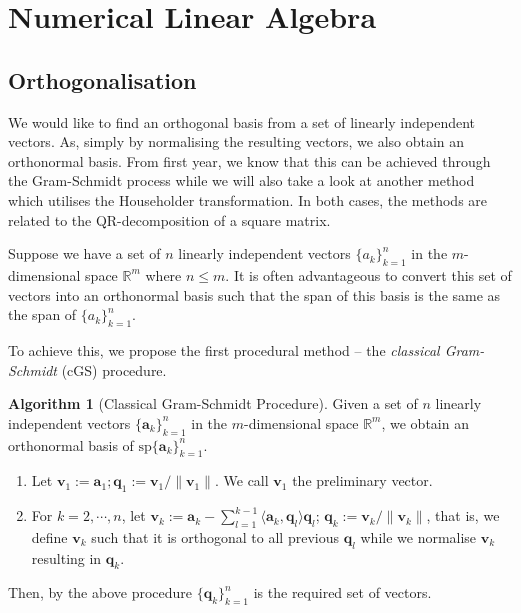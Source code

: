 \documentclass[
]{article}
\theoremstyle{definition}
\newtheorem{alg}{Algorithm}
\theoremstyle{definition}
\begin{document}
\hypertarget{numerical-linear-algebra}{%
\section{Numerical Linear Algebra}\label{numerical-linear-algebra}}

\hypertarget{orthogonalisation}{%
\subsection{Orthogonalisation}\label{orthogonalisation}}

We would like to find an orthogonal basis from a set of linearly
independent vectors. As, simply by normalising the resulting vectors, we
also obtain an orthonormal basis. From first year, we know that this can
be achieved through the Gram-Schmidt process while we will also take a
look at another method which utilises the Householder transformation. In
both cases, the methods are related to the QR-decomposition of a square
matrix.

Suppose we have a set of \(n\) linearly independent vectors
\(\{a_k\}_{k=1}^n\) in the \(m\)-dimensional space \(\mathbb{R}^m\)
where \(n \le m\). It is often advantageous to convert this set of
vectors into an orthonormal basis such that the span of this basis is
the same as the span of \(\{a_k\}_{k=1}^n\).

To achieve this, we propose the first procedural method -- the
\emph{classical Gram-Schmidt} (cGS) procedure.

\begin{alg}[Classical Gram-Schmidt Procedure]
  Given a set of \(n\) linearly independent vectors \(\{\mathbf{a}_k\}_{k=1}^n\) 
  in the \(m\)-dimensional space \(\mathbb{R}^m\), we obtain an orthonormal basis 
  of \(\text{sp} \{\mathbf{a}_k\}_{k=1}^n\).
  \begin{enumerate}
    \item Let \(\mathbf{v}_1 := \mathbf{a}_1; \mathbf{q}_1 := 
      \mathbf{v}_1 / \| \mathbf{v}_1 \|\). We call \(\mathbf{v}_1\) the preliminary vector.
    \item For \(k = 2, \cdots, n\),
      let \(\mathbf{v}_k := \mathbf{a}_k - \sum_{l = 1}^{k-1} \langle \mathbf{a}_k, 
        \mathbf{q}_l \rangle \mathbf{q}_l\); \(\mathbf{q}_k := \mathbf{v}_k / \|\mathbf{v}_k\|\),
        that is, we define \(\mathbf{v}_k\) such that it is orthogonal to all previous 
        \(\mathbf{q}_l\) while we normalise \(\mathbf{v}_k\) resulting in \(\mathbf{q}_k\).
  \end{enumerate}
  Then, by the above procedure \(\{\mathbf{q}_k\}_{k = 1}^n\) is the required set 
  of vectors.
\end{alg}
\end{document}
